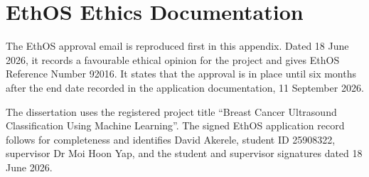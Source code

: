 \chapter{EthOS Ethics Documentation}
\label{app:ethos}

The EthOS approval email is reproduced first in this appendix. Dated 18 June 2026, it records a favourable ethical opinion for the project and gives EthOS Reference Number 92016. It states that the approval is in place until six months after the end date recorded in the application documentation, 11 September 2026.

The dissertation uses the registered project title ``Breast Cancer Ultrasound Classification Using Machine Learning''. The signed EthOS application record follows for completeness and identifies David Akerele, student ID 25908322, supervisor Dr Moi Hoon Yap, and the student and supervisor signatures dated 18 June 2026.



\clearpage


